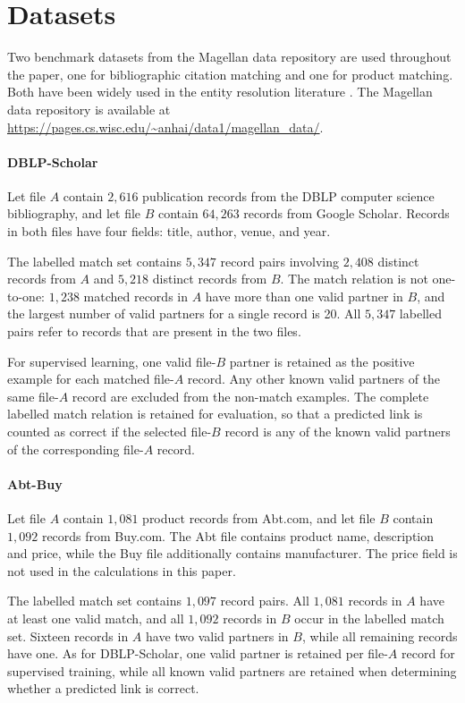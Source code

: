 ﻿%

\section{Datasets}
\label{sec:appendix-datasets}
\label{app:datasets}

Two benchmark datasets from the Magellan data repository
\citep{konda2016magellan} are used throughout the paper, one for
bibliographic citation matching and one for product matching.
Both have been widely used in the entity resolution literature
\citep[e.g.][]{mudgal2018deep, li2020deep, peeters2021dual}.
The Magellan data repository is available at
\url{https://pages.cs.wisc.edu/~anhai/data1/magellan_data/}.

\paragraph{DBLP-Scholar}
Let file $A$ contain $2{,}616$ publication records from the DBLP
computer science bibliography, and let file $B$ contain $64{,}263$
records from Google Scholar. Records in both files have four fields:
title, author, venue, and year.

The labelled match set contains $5{,}347$ record pairs involving
$2{,}408$ distinct records from $A$ and $5{,}218$ distinct records
from $B$. The match relation is not one-to-one:
$1{,}238$ matched records in $A$ have more than one valid partner in
$B$, and the largest number of valid partners for a single record is
20. All $5{,}347$ labelled pairs refer to records that are present in
the two files.

For supervised learning, one valid file-$B$ partner is retained as
the positive example for each matched file-$A$ record. Any other
known valid partners of the same file-$A$ record are excluded from
the non-match examples. The complete labelled match relation is
retained for evaluation, so that a predicted link is counted as
correct if the selected file-$B$ record is any of the known valid
partners of the corresponding file-$A$ record.

\paragraph{Abt-Buy}
Let file $A$ contain $1{,}081$ product records from Abt.com, and let
file $B$ contain $1{,}092$ records from Buy.com. The Abt file contains product name, description and price, while the Buy file
additionally contains manufacturer. The price field is not used in the calculations in this
paper.

The labelled match set contains $1{,}097$ record pairs. All
$1{,}081$ records in $A$ have at least one valid match, and all
$1{,}092$ records in $B$ occur in the labelled match set. Sixteen
records in $A$ have two valid partners in $B$, while all remaining
records have one. As for DBLP-Scholar, one valid partner is retained
per file-$A$ record for supervised training, while all known valid
partners are retained when determining whether a predicted link is
correct.
